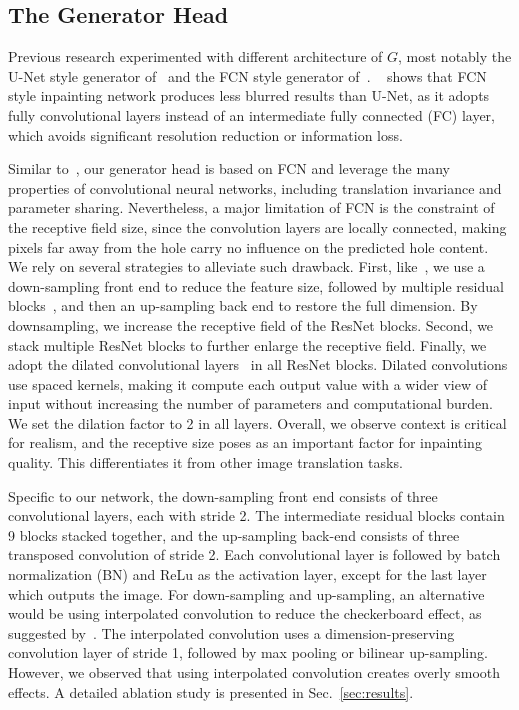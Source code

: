 \subsection{The Generator Head}
\label{sec:resnet_head}

Previous research experimented with different architecture of $G$, most notably the U-Net style generator of~\cite{pathak2016context} and the FCN style generator of~\cite{iizuka2017globally}. ~\cite{iizuka2017globally} shows that FCN style inpainting network produces less blurred results than U-Net, as it adopts fully convolutional layers instead of an intermediate fully connected (FC) layer, which avoids significant resolution reduction or information loss. 

Similar to~\cite{iizuka2017globally}, our generator head is based on FCN and leverage the many properties of convolutional neural networks, including translation invariance and parameter sharing. Nevertheless, a major limitation of FCN is the constraint of the receptive field size, since the convolution layers are locally connected, making pixels far away from the hole carry no influence on the predicted hole content. We rely on several strategies to alleviate such drawback. First, like~\cite{iizuka2017globally}, we use a down-sampling front end to reduce the feature size, followed by multiple residual blocks~\cite{he2016deep}, and then an up-sampling back end to restore the full dimension. By downsampling, we increase the receptive field of the ResNet blocks. Second, we stack multiple ResNet blocks to further enlarge the receptive field. Finally, we adopt the dilated convolutional layers~\cite{yu2015multi} in all ResNet blocks. Dilated convolutions use spaced kernels, making it compute each output value with a wider view of input without increasing the number of parameters and computational burden. We set the dilation factor to 2 in all layers. Overall, we observe context is critical for realism, and the receptive size poses as an important factor for inpainting quality. This differentiates it from other image translation tasks. 

Specific to our network, the down-sampling front end consists of three convolutional layers, each with stride 2. The intermediate residual blocks contain 9 blocks stacked together, and the up-sampling back-end consists of three transposed convolution of stride 2. Each convolutional layer is followed by batch normalization (BN) and ReLu as the activation layer, except for the last layer which outputs the image. For down-sampling and up-sampling, an alternative would be using interpolated convolution to reduce the checkerboard effect, as suggested by~\cite{odena2016deconvolution}. The interpolated convolution uses a dimension-preserving convolution layer of stride 1, followed by max pooling or bilinear up-sampling. However, we observed that using interpolated convolution creates overly smooth effects. A detailed ablation study is presented in Sec.~\ref{sec:results}.

